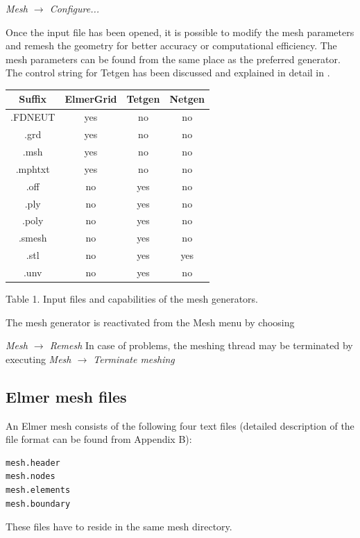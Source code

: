 \documentclass[a4paper,12pt]{article}
\newcommand{\menu}[2]{{\it \vskip2mm #1 $\rightarrow$ #2 \vskip2mm}}
\begin{document}
\menu{Mesh}{Configure...}

Once the input file has been opened, it is possible to modify the mesh parameters
and remesh the geometry for better accuracy or computational efficiency. The mesh parameters
can be found from the same place as the preferred generator. The control string for Tetgen
has been discussed and explained in detail in \cite{TetgenHome}.

\begin{center}
\begin{tabular}{|c|c|c|c|}
\hline
 Suffix & ElmerGrid & Tetgen & Netgen \\
\hline 
.FDNEUT & yes & no & no \\
.grd  & yes & no & no \\
.msh & yes & no & no \\
.mphtxt & yes & no & no \\
.off & no & yes & no \\
.ply & no & yes & no \\
.poly & no & yes & no \\
.smesh & no & yes & no \\
.stl  & no & yes & yes \\
.unv & no & yes & no \\
\hline
\end{tabular}
\vskip5mm
Table 1. Input files and capabilities of the mesh generators.
\end{center}

The mesh generator is reactivated from the Mesh menu by choosing

\menu{Mesh}{Remesh}
\noindent In case of problems, the meshing thread may be terminated by executing 
\menu{Mesh}{Terminate meshing}

\subsection{Elmer mesh files}

An Elmer mesh consists of the following four text files (detailed description of the file format can be found from Appendix B):

\begin{footnotesize}
\begin{verbatim}
mesh.header 
mesh.nodes 
mesh.elements 
mesh.boundary 
\end{verbatim}
\end{footnotesize}

\noindent These files have to reside in the same mesh directory.
\end{document}

